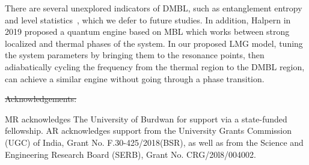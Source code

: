 \documentclass[%
reprint,
superscriptaddress,
amsmath,amssymb,
aps,
prb,
showkeys,
]{revtex4-2}
\providecommand{\DIFdeltex}[1]{{\protect\color{red}\sout{#1}}}                      %
\providecommand{\DIFaddbegin}{} %
\providecommand{\DIFaddend}{} %
\providecommand{\DIFdelbegin}{} %
\providecommand{\DIFdelend}{} %
\providecommand{\DIFdel}[1]{\texorpdfstring{\DIFdeltex{#1}}{}} %
\newcommand{\DIFscaledelfig}{0.5}
\newlength{\DIFdelgraphicswidth} %
\newlength{\DIFdelgraphicsheight} %
\newcommand{\DIFaddincludegraphics}[2][]{{\color{blue}\fbox{\DIFOincludegraphics[#1]{#2}}}} %
\newcommand{\DIFdelincludegraphics}[2][]{%
\sbox{\DIFdelgraphicsbox}{\DIFOincludegraphics[#1]{#2}}%
\settoboxwidth{\DIFdelgraphicswidth}{\DIFdelgraphicsbox} %
\settoboxtotalheight{\DIFdelgraphicsheight}{\DIFdelgraphicsbox} %
\scalebox{\DIFscaledelfig}{%
\parbox[b]{\DIFdelgraphicswidth}{\usebox{\DIFdelgraphicsbox}\\[-\baselineskip] \rule{\DIFdelgraphicswidth}{0em}}\llap{\resizebox{\DIFdelgraphicswidth}{\DIFdelgraphicsheight}{%
\setlength{\unitlength}{\DIFdelgraphicswidth}%
\begin{picture}(1,1)%
\thicklines\linethickness{2pt} %
{\color[rgb]{1,0,0}\put(0,0){\framebox(1,1){}}}%
{\color[rgb]{1,0,0}\put(0,0){\line( 1,1){1}}}%
{\color[rgb]{1,0,0}\put(0,1){\line(1,-1){1}}}%
\end{picture}%
}\hspace*{3pt}}} %
} %
\DeclareRobustCommand{\DIFaddbegin}{\DIFOaddbegin \let\includegraphics\DIFaddincludegraphics} %
\DeclareRobustCommand{\DIFaddend}{\DIFOaddend \let\includegraphics\DIFOincludegraphics} %
\DeclareRobustCommand{\DIFdelbegin}{\DIFOdelbegin \let\includegraphics\DIFdelincludegraphics} %
\DeclareRobustCommand{\DIFdelend}{\DIFOaddend \let\includegraphics\DIFOincludegraphics} %
\begin{document}
There are several unexplored indicators of DMBL, such as entanglement entropy and level statistics~\cite{khemani_phase_2016}, which we defer to future studies. In addition, Halpern in 2019 proposed a quantum engine based on MBL\cite{yunger_halpern_quantum_2019} which works  between strong localized and thermal phases of the system. In our proposed LMG model, tuning the system parameters by bringing them to the resonance points, then adiabatically cycling the frequency from the thermal region to the DMBL region, can achieve a similar engine without going through a phase transition. 

\DIFdelbegin %
\DIFdel{Acknowledgements:}%
\DIFdelend \DIFaddbegin \begin{acknowledgments}
\DIFaddend MR acknowledges The University of Burdwan for support via a state-funded fellowship. AR acknowledges support from the University Grants Commission (UGC) of India, Grant No. F.30-425/2018(BSR), as well as from the Science and Engineering Research Board (SERB), Grant No. CRG/20l8/004002.
\DIFaddbegin \end{acknowledgments}
\DIFaddend 


\DIFdelbegin %
\DIFdelend \DIFaddbegin \DIFaddend %
\end{document}
